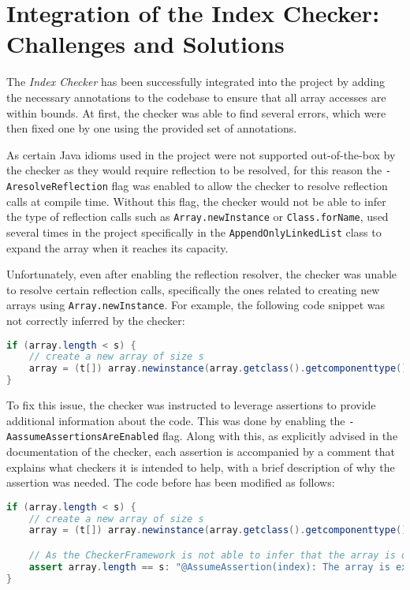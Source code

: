 \documentclass[a4paper, 11pt]{article}
\begin{document}
\pagebreak

\section{Integration of the Index Checker: Challenges and Solutions}

The \textit{Index Checker} has been successfully integrated into the project by adding the necessary annotations to the codebase to ensure that all array accesses are within bounds. At first, the checker was able to find several errors, which were then fixed one by one using the provided set of annotations.

As certain Java idioms used in the project were not supported out-of-the-box by the checker as they would require reflection to be resolved, for this reason the \texttt{-AresolveReflection} flag was enabled to allow the checker to resolve reflection calls at compile time. Without this flag, the checker would not be able to infer the type of reflection calls such as \texttt{Array.newInstance} or \texttt{Class.forName}, used several times in the project specifically in the \texttt{AppendOnlyLinkedList} class to expand the array when it reaches its capacity.

Unfortunately, even after enabling the reflection resolver, the checker was unable to resolve certain reflection calls, specifically the ones related to creating new arrays using \texttt{Array.newInstance}. For example, the following code snippet was not correctly inferred by the checker:

\begin{lstlisting}[language=java,breaklines=true,caption={Reflection call to create a new array},label={lst:reflection-array},captionpos=b]
if (array.length < s) {
    // create a new array of size s
    array = (t[]) array.newinstance(array.getclass().getcomponenttype(), s);
}
\end{lstlisting}

To fix this issue, the checker was instructed to leverage assertions to provide additional information about the code. This was done by enabling the \texttt{-AassumeAssertionsAreEnabled} flag. Along with this, as explicitly advised in the documentation of the checker, each assertion is accompanied by a comment that explains what checkers it is intended to help, with a brief description of why the assertion was needed. The code before has been modified as follows:

\begin{lstlisting}[language=java,breaklines=true,caption={Using assertions to help the Index Checker infer the array length},label={lst:array-length},captionpos=b]
if (array.length < s) {
    // create a new array of size s
    array = (t[]) array.newinstance(array.getclass().getcomponenttype(), s);

    // As the CheckerFramework is not able to infer that the array is of length s, we need to make an assertion
    assert array.length == s: "@AssumeAssertion(index): The array is exactly of length s, as we have just created it";
}
\end{lstlisting}
\end{document}
